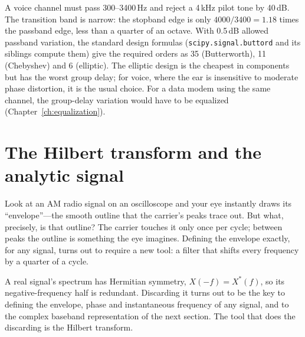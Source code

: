 
\begin{worked}
A voice channel must pass 300--3400\,Hz and reject a 4\,kHz pilot tone by 40\,dB. The
transition band is narrow: the stopband edge is only $4000/3400=1.18$ times the passband edge, less
than a quarter of an octave. With 0.5\,dB allowed passband variation, the standard design formulas
(\texttt{scipy.signal.buttord} and its siblings compute them) give the required orders as 35
(Butterworth), 11 (Chebyshev) and 6 (elliptic). The elliptic design is the cheapest
in components but has the worst group delay; for voice, where the ear is insensitive to moderate
phase distortion, it is the usual choice. For a data modem using the same channel, the group-delay
variation would have to be equalized (Chapter~\ref{ch:equalization}).
\end{worked}

\section{The Hilbert transform and the analytic signal}
\label{sec:ch02:hilbert}

Look at an AM radio signal on an oscilloscope and your eye instantly draws its ``envelope''---the
smooth outline that the carrier's peaks trace out. But what, precisely, is that outline? The carrier
touches it only once per cycle; between peaks the outline is something the eye imagines. Defining
the envelope exactly, for any signal, turns out to require a new tool: a filter that shifts every
frequency by a quarter of a cycle.

A real signal's spectrum has Hermitian symmetry, $X(-f)=X^*(f)$, so its negative-frequency half
is redundant. Discarding it turns out to be the key to defining the envelope, phase and
instantaneous frequency of any signal, and to the complex baseband representation of the next
section. The tool that does the discarding is the Hilbert transform.


